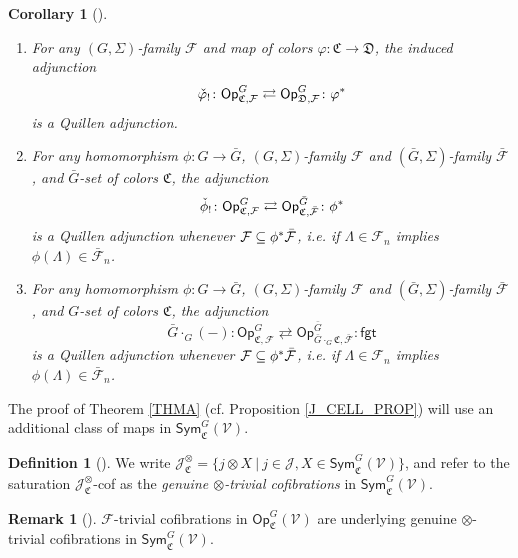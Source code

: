 \documentclass[a4paper,10pt
 ,final
]{article}%
\numberwithin{equation}{section}
\numberwithin{figure}{section}
\newtheorem{corollary}[equation]{Corollary}%
\theoremstyle{definition} %
\newtheorem{definition}[equation]{Definition}%
\newtheorem{remark}[equation]{Remark}%
\newcommand{\Op}{\mathsf{Op}}%
\newcommand{\F}{\ensuremath{\mathcal F}}
\newcommand{\V}{\ensuremath{\mathcal V}}
\newcommand{\1}{\ensuremath{\mathbbm 1}}%
\begin{document}
\begin{corollary}[{\cite[Cor. \ref{OC-OPADJ_COR}]{BP_FCOP}}]
	\label{OPADJ_COR}
	\begin{enumerate}[label=(\roman*)]
		\item \label{OPCOCHADJ_LBL}
		For any $(G,\Sigma)$-family $\F$ and map of colors 
		$\varphi \colon \mathfrak C \to \mathfrak D$, the induced adjunction
		\[
		\check{\varphi}_! \colon \mathsf{Op}^G_{\mathfrak{C},\F}
		\rightleftarrows
		\mathsf{Op}^G_{\mathfrak{D},\F} \colon \varphi^{\**}
		\]
		is a Quillen adjunction.
		\item \label{OPFIXSETCHGR_LBL}
		For any homomorphism $\phi \colon G \to \bar G$,
		$(G,\Sigma)$-family $\F$ and $(\bar G,\Sigma)$-family $\bar{\F}$,
		and $\bar G$-set of colors $\mathfrak C$,
		the adjunction
		\[
		\check{\phi}_! \colon \mathsf{Op}^G_{\mathfrak{C},\F}
		\rightleftarrows
		\mathsf{Op}^{\bar{G}}_{\mathfrak{C},\bar{\F}} \colon \phi^{\**}
		\]
		is a Quillen adjunction whenever $\F \subseteq \phi^{\**} \bar{\F}$, i.e.
		if $\Lambda \in \F_n$ implies 
		$\phi(\Lambda) \in \bar{\F}_n$.
		\item \label{OPCOMBADJ_LBL}
		For any homomorphism $\phi \colon G \to \bar G$,
		$(G,\Sigma)$-family $\F$ and $(\bar G,\Sigma)$-family $\bar{\F}$,
		and $G$-set of colors $\mathfrak C$,
		the adjunction
		\[
		\bar{G} \cdot_G (-) \colon \mathsf{Op}^G_{\mathfrak{C},\F}
		\rightleftarrows
		\mathsf{Op}^{\bar{G}}_{\bar{G} \cdot_G \mathfrak{C},\bar{\F}} \colon \mathsf{fgt}
		\]
		is a Quillen adjunction whenever $\F \subseteq \phi^{\**} \bar{\F}$, i.e.
		if $\Lambda \in \F_n$ implies 
		$\phi(\Lambda) \in \bar{\F}_n$.
	\end{enumerate}
\end{corollary}


The proof of Theorem \ref{THMA}
(cf. Proposition \ref{J_CELL_PROP})
will use an additional class of maps in
$\mathsf{Sym}^G_{\mathfrak C}(\V)$.


\begin{definition}[{\cite[Def. \ref{OC-GGENOTITC DEF}]{BP_FCOP}}]
	\label{GGENOTITC DEF}
	We write 
	$\mathcal{J}^{\otimes}_{\mathfrak{C}}=
	\{j \otimes X \ | \ j \in \mathcal{J}, X \in \mathsf{Sym}^G_{\mathfrak C}(\V)\}$,
	and refer to the saturation
	$\mathcal{J}^{\otimes}_{\mathfrak{C}}$-cof
	as the \emph{genuine $\otimes$-trivial cofibrations}
	in $\mathsf{Sym}^G_{\mathfrak C}(\V)$.	
\end{definition}

\begin{remark}[{\cite[Rem. \ref{OC-GOTC_REM}]{BP_FCOP}}]
	\label{GOTC_REM}
	$\F$-trivial cofibrations in $\Op^G_{\mathfrak C}(\V)$ are underlying genuine $\otimes$-trivial cofibrations
	in $\mathsf{Sym}^G_{\mathfrak C}(\V)$.
\end{remark}
\end{document}
